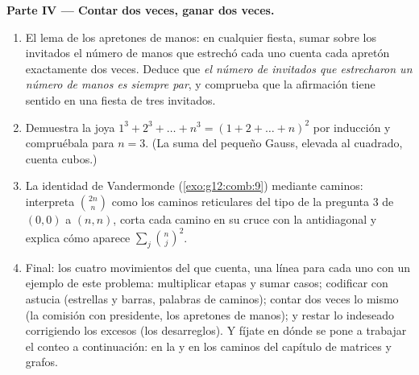 \begin{problem}
\medskip
\noindent\textbf{Parte IV --- Contar dos veces, ganar dos veces.}
\begin{enumerate}[resume]
  \item El lema de los apretones de manos: en cualquier fiesta, sumar sobre
        los invitados el número de manos que estrechó cada uno cuenta cada
        apretón exactamente dos veces. Deduce que \emph{el número de
        invitados que estrecharon un número  de manos es siempre par},
        y comprueba que la afirmación tiene sentido en una fiesta de tres
        invitados.
  \item Demuestra la joya
        $1^3 + 2^3 + \dots + n^3 = (1 + 2 + \dots + n)^2$ por inducción y
        compruébala para $n = 3$. (La suma del pequeño Gauss, elevada al
        cuadrado, cuenta cubos.)
  \item La identidad de Vandermonde (\cref{exo:g12:comb:9}) mediante
        caminos: interpreta $\binom{2n}{n}$ como los caminos reticulares del
        tipo de la pregunta 3 de $(0,0)$ a $(n,n)$, corta cada camino en su
        cruce con la antidiagonal y explica cómo aparece
        $\sum_j \binom nj^2$.
  \item Final: los cuatro movimientos del que cuenta, una línea para cada
        uno con un ejemplo de este problema: multiplicar etapas y sumar
        casos; codificar con astucia (estrellas y barras, palabras de
        caminos); contar dos veces lo mismo (la comisión con presidente, los
        apretones de manos); y restar lo indeseado corrigiendo los excesos
        (los desarreglos). Y fíjate en dónde se pone a trabajar el conteo a
        continuación: en la  y en los caminos del capítulo de
        matrices y grafos.
\end{enumerate}
\end{problem}

